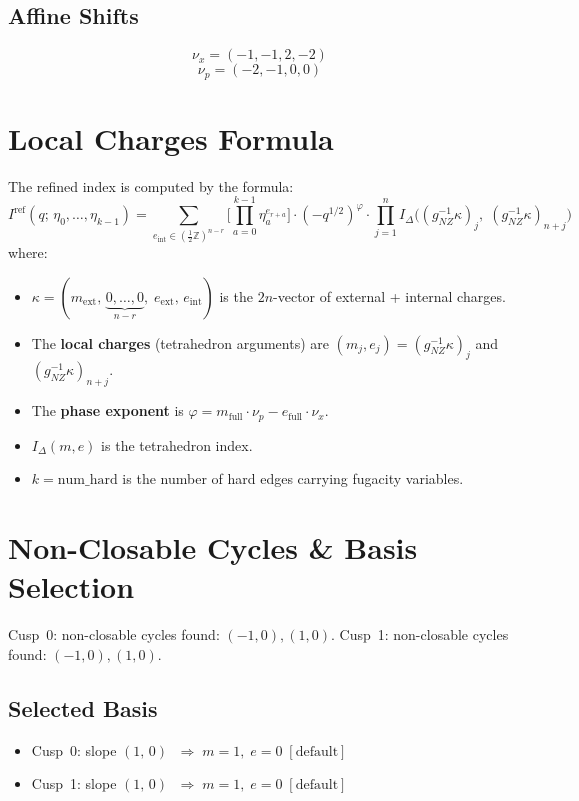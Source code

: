 \documentclass[11pt,a4paper]{article}
\begin{document}
\subsection{Affine Shifts}
$$\nu_x = (-1, -1, 2, -2)$$
$$\nu_p = (-2, -1, 0, 0)$$

\section{Local Charges Formula}
The refined index is computed by the formula:
\begin{equation}
  I^{\text{ref}}(q;\, \eta_0, \ldots, \eta_{k-1})
  = \sum_{e_{\text{int}} \in (\frac{1}{2}\mathbb{Z})^{n-r}}
    \biggl[\prod_{a=0}^{k-1} \eta_a^{e_{r+a}}\biggr]
    \cdot (-q^{1/2})^{\varphi}
    \cdot \prod_{j=1}^{n}
      I_\Delta\bigl((g_{NZ}^{-1}\kappa)_j,\;
                     (g_{NZ}^{-1}\kappa)_{n+j}\bigr)
\end{equation}
where:
\begin{itemize}
  \item $\kappa = (m_{\text{ext}},\, \underbrace{0,\ldots,0}_{n-r},\; e_{\text{ext}},\, e_{\text{int}})$ is the $2n$-vector of external + internal charges.
  \item The \textbf{local charges} (tetrahedron arguments) are $(m_j, e_j) = (g_{NZ}^{-1}\kappa)_j$ and $(g_{NZ}^{-1}\kappa)_{n+j}$.
  \item The \textbf{phase exponent} is $\varphi = m_{\text{full}} \cdot \nu_p - e_{\text{full}} \cdot \nu_x$.
  \item $I_\Delta(m, e)$ is the tetrahedron index.
  \item $k = \text{num\_hard}$ is the number of hard edges carrying fugacity variables.
\end{itemize}

\section{Non-Closable Cycles \& Basis Selection}
Cusp~0: non-closable cycles found: $(-1, 0), (1, 0)$.
Cusp~1: non-closable cycles found: $(-1, 0), (1, 0)$.

\subsection*{Selected Basis}
\begin{itemize}
  \item Cusp~0: slope $(1,\, 0)$ $\;\Rightarrow\; m = 1,\; e = 0 \; [\text{default}]$
  \item Cusp~1: slope $(1,\, 0)$ $\;\Rightarrow\; m = 1,\; e = 0 \; [\text{default}]$
\end{itemize}
\end{document}
